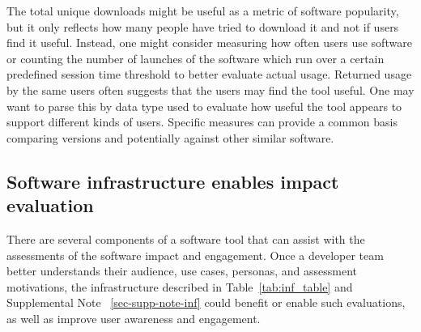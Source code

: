 \documentclass{article}
\begin{document}
The total unique downloads might be useful as a metric of software popularity, but it only reflects how many people have tried to download it and not if users find it useful. Instead, one might consider measuring how often users use software or  counting the number of launches of the software which run over a certain predefined session time threshold to better evaluate actual usage. Returned usage by the same users often suggests that the users may find the tool useful. One may want to parse this by data type used to evaluate how useful the tool appears to support different kinds of users.   Specific measures can provide a common basis comparing versions and potentially against other similar software.


\subsection{Software infrastructure enables impact evaluation}
There are several components of a software tool that can assist with the assessments of the software impact and engagement. Once a developer team better understands their audience, use cases, personas, and assessment motivations, the infrastructure described in Table~\ref{tab:inf_table} and Supplemental Note ~\ref{sec-supp-note-inf} could benefit or enable such evaluations, as well as improve user awareness and engagement.
\end{document}

